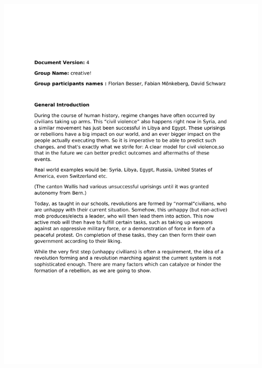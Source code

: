 \documentclass[11pt]{article}
\begin{document}
\includegraphics[bb=1.0in 1.0in 7.5in 10in,page=2]{Proposal.pdf}
\newpage
\end{document}
